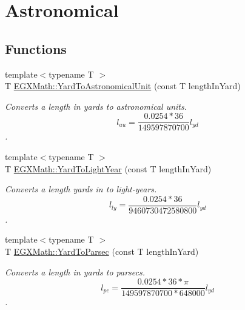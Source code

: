 \hypertarget{group___e_g_x_math-_conversions-_length_conversions-_imperial-_yard-_astronomical}{}\section{Astronomical}
\label{group___e_g_x_math-_conversions-_length_conversions-_imperial-_yard-_astronomical}
\subsection*{Functions}
\begin{DoxyCompactItemize}
\item 
{\footnotesize template$<$typename T $>$ }\\T \mbox{\hyperlink{group___e_g_x_math-_conversions-_length_conversions-_imperial-_yard-_astronomical_gae62795f30f07c62e0082725518bc0369}{E\+G\+X\+Math\+::\+Yard\+To\+Astronomical\+Unit}} (const T length\+In\+Yard)
\begin{DoxyCompactList}\small\item\em Converts a length in yards to astronomical units. \[ l_{au}=\frac{0.0254 * 36}{149597870700} l_{yd} \]. \end{DoxyCompactList}\item 
{\footnotesize template$<$typename T $>$ }\\T \mbox{\hyperlink{group___e_g_x_math-_conversions-_length_conversions-_imperial-_yard-_astronomical_ga7e91cb1696861e32c239712c901f369f}{E\+G\+X\+Math\+::\+Yard\+To\+Light\+Year}} (const T length\+In\+Yard)
\begin{DoxyCompactList}\small\item\em Converts a length yards in to light-\/years. \[ l_{ly}=\frac{0.0254 * 36}{9460730472580800} l_{yd} \]. \end{DoxyCompactList}\item 
{\footnotesize template$<$typename T $>$ }\\T \mbox{\hyperlink{group___e_g_x_math-_conversions-_length_conversions-_imperial-_yard-_astronomical_ga23f43ac2cd611de8ead9af1772607dd8}{E\+G\+X\+Math\+::\+Yard\+To\+Parsec}} (const T length\+In\+Yard)
\begin{DoxyCompactList}\small\item\em Converts a length in yards to parsecs. \[ l_{pc}=\frac{0.0254 * 36 * \pi}{149597870700 * 648000} l_{yd} \]. \end{DoxyCompactList}\end{DoxyCompactItemize}


